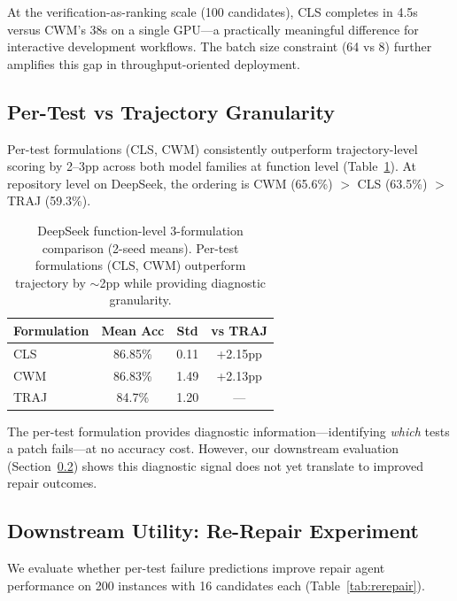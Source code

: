 \documentclass[11pt,a4paper]{article}
\begin{document}
At the verification-as-ranking scale (100 candidates), CLS completes in 4.5s versus CWM's 38s on a single GPU---a practically meaningful difference for interactive development workflows. The batch size constraint (64 vs 8) further amplifies this gap in throughput-oriented deployment.

\subsection{Per-Test vs Trajectory Granularity}
\label{sec:granularity}

Per-test formulations (CLS, CWM) consistently outperform trajectory-level scoring by 2--3pp across both model families at function level (Table~\ref{tab:func_three}). At repository level on DeepSeek, the ordering is CWM (65.6\%) $>$ CLS (63.5\%) $>$ TRAJ (59.3\%).

\begin{table}[t]
\centering
\small
\begin{tabular}{lccc}
\toprule
\textbf{Formulation} & \textbf{Mean Acc} & \textbf{Std} & \textbf{vs TRAJ} \\
\midrule
CLS & 86.85\% & 0.11 & +2.15pp \\
CWM & 86.83\% & 1.49 & +2.13pp \\
TRAJ & 84.7\% & 1.20 & --- \\
\bottomrule
\end{tabular}
\caption{DeepSeek function-level 3-formulation comparison (2-seed means). Per-test formulations (CLS, CWM) outperform trajectory by $\sim$2pp while providing diagnostic granularity.}
\label{tab:func_three}
\end{table}

The per-test formulation provides diagnostic information---identifying \emph{which} tests a patch fails---at no accuracy cost. However, our downstream evaluation (Section~\ref{sec:rerepair}) shows this diagnostic signal does not yet translate to improved repair outcomes.

\subsection{Downstream Utility: Re-Repair Experiment}
\label{sec:rerepair}

We evaluate whether per-test failure predictions improve repair agent performance on 200 instances with 16 candidates each (Table~\ref{tab:rerepair}).
\end{document}

